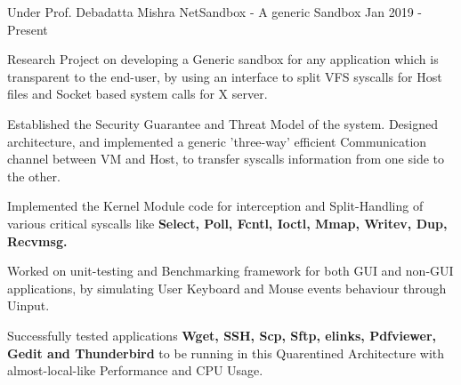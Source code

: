 
\begin{cventries}

  \cventry
  {Under Prof. Debadatta Mishra}
  {NetSandbox - A generic Sandbox}
  {}
  {Jan 2019 - Present}
  {
    \begin{cvitems}
    \item Research Project on developing a Generic sandbox for any application which is transparent to the end-user, by using an interface to split VFS syscalls for Host files and Socket based system calls for X server.
    \item Established the Security Guarantee and Threat Model of the system. Designed architecture, and implemented a generic 'three-way' efficient Communication channel between VM and Host, to transfer syscalls information from one side to the other. 
    \item Implemented the Kernel Module code for interception and Split-Handling of various critical syscalls like \textbf{Select, Poll, Fcntl, Ioctl, Mmap, Writev, Dup, Recvmsg.} 
    \item Worked on unit-testing and Benchmarking framework for both GUI and non-GUI applications, by simulating User Keyboard and Mouse events behaviour through Uinput.
    \item Successfully tested applications \textbf{Wget, SSH, Scp, Sftp, elinks, Pdfviewer, Gedit and Thunderbird} to be running in this Quarentined Architecture with almost-local-like Performance and CPU Usage.
    \end{cvitems}
  }

\end{cventries}
\vspace{-2mm}

